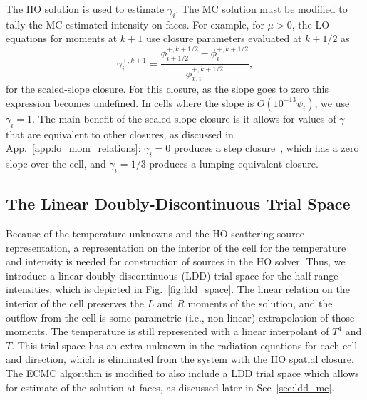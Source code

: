 The HO solution is used to estimate $\gamma_i$. The MC solution must be modified
to tally the MC estimated intensity on faces. For example, for $\mu>0$, the LO equations for
moments at $k+1$ use closure parameters evaluated at $k+1/2$ as
\begin{equation}
    \gamma_{i}^{+,k+1} = \frac{\phi_{i+1/2}^{+,k+1/2} -
    \phi_{i}^{+,k+1/2}}{\phi_{x,i}^{+,k+1/2}},
\end{equation}
for the scaled-slope closure.  For this closure, as the slope goes to zero this expression
becomes undefined.  In cells where the slope is $O(10^{-13} \psi_i)$, we use $\gamma_i=1$.
The main benefit of the scaled-slope closure is it allows for values of $\gamma$ that are
equivalent to other closures, as discussed in App.~\ref{app:lo_mom_relations}:
$\gamma_i=0$ produces a step closure~\cite{larsen_edl}, which has a zero slope over the cell, and $\gamma_i=1/3$
produces a lumping-equivalent closure. 

\subsection{The Linear Doubly-Discontinuous Trial Space}
\label{sec:ldd}

Because of the temperature unknowns and the HO scattering source representation, a
representation on the interior of the cell for the temperature and intensity is needed for
construction of sources in the HO solver.
Thus, we introduce a linear doubly discontinuous (LDD) trial space
for the half-range intensities, which is depicted in Fig.~\ref{fig:ldd_space}.  The linear
relation on the interior of the cell preserves the $L$ and $R$ moments of the solution,
and the outflow from the cell is some parametric (i.e., non linear) extrapolation of
those moments. 
The temperature is still represented with a linear interpolant of $T^4$ and $T$.  This
trial space has an extra unknown in the radiation equations for each cell and direction, which is eliminated
from the system with the HO spatial closure.  The ECMC algorithm is modified to also
include a LDD trial space which allows for estimate of the solution at faces, as discussed
later in Sec~\ref{sec:ldd_mc}. 

